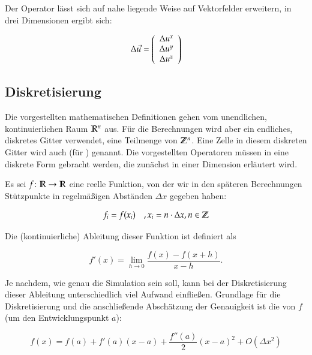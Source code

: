 Der Operator lässt sich auf nahe liegende Weise auf Vektorfelder erweitern, in drei Dimensionen
ergibt sich:

\begin{equation}
\Delta \vec{u} =
\left(
	\begin{array}{c}
		\Delta u^x \\
		\Delta u^y \\
		\Delta u^z
	\end{array}
\right)
\end{equation}

\subsection{Diskretisierung}
\label{sec:mathematics_discretization}

Die vorgestellten mathematischen Definitionen gehen vom unendlichen,
kontinuierlichen Raum $\mathbb{R}^n$ aus. Für die Berechnungen wird
aber ein endliches, diskretes Gitter verwendet, \Pimiddydh{} eine
Teilmenge von $\mathbb{Z}^n$. Eine Zelle in diesem diskreten Gitter
wird auch  (für )
genannt. Die vorgestellten Operatoren müssen in eine diskrete Form
gebracht werden, die zunächst in einer Dimension erläutert wird.

Es sei $f \colon \mathbb{R} \to \mathbb{R}$ eine reelle Funktion, von der
wir in den späteren Berechnungen Stützpunkte in regelmäßigen Abständen
$\Delta x$ gegeben haben:

\begin{equation}
f_i = f(x_i) \quad , x_i = n \cdot \Delta x, n \in \mathbb{Z}
\end{equation}

Die (kontinuierliche) Ableitung dieser Funktion ist definiert als

\begin{equation}
f'(x) = \lim_{h \to 0} \frac{f(x) - f(x+h)}{x - h}.
\end{equation}

Je nachdem, wie genau die Simulation sein soll, kann bei der
Diskretisierung dieser Ableitung unterschiedlich viel Aufwand
einfließen. Grundlage für die Diskretisierung und die anschließende
Abschätzung der Genauigkeit ist die  von
$f$ (um den Entwicklungspunkt $a$):

\begin{equation}
f(x) = f(a) + f'(a)(x-a) + \frac{f''(a)}{2}{(x-a)}^2 + O(\Delta x^2)
\end{equation}

